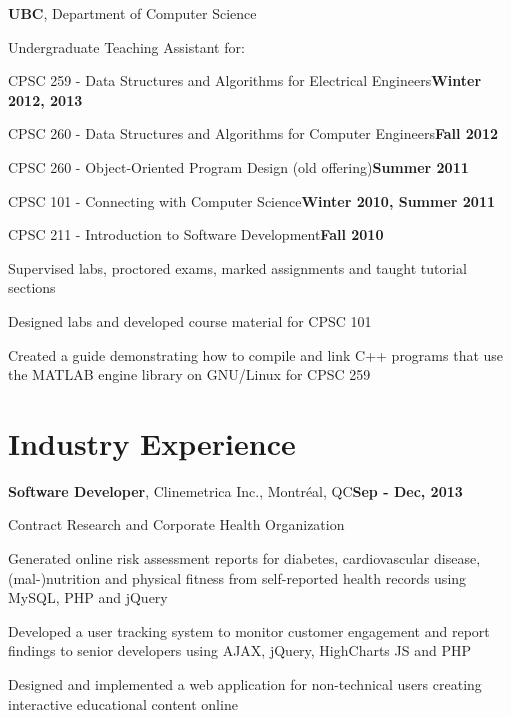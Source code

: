 \documentclass[margin,line]{res}
\newenvironment{list1}{
  \begin{list}{\ding{113}}{
      \setlength{\itemsep}{0in}
      \setlength{\parsep}{0in} \setlength{\parskip}{0in}
      \setlength{\topsep}{0in} \setlength{\partopsep}{0in}
      \setlength{\leftmargin}{0.17in}}}{\end{list}}
\newenvironment{list3}{
  \begin{list}{\textopenbullet}{
      \setlength{\itemsep}{0in}
      \setlength{\parsep}{0in} \setlength{\parskip}{0in}
      \setlength{\topsep}{0in} \setlength{\partopsep}{0in}
      \setlength{\leftmargin}{0.1in}}}{\end{list}}
\begin{document}
\begin{resume}
{\bf UBC}, Department of Computer Science\\
\vspace*{-.2cm}
\begin{list1}
\setlength\itemsep{0.25em}
\item[] Undergraduate Teaching Assistant for:\\[-0.1cm]
\item[] CPSC 259 - Data Structures and Algorithms for Electrical Engineers\hfill{\bf Winter 2012, 2013}
\item[] CPSC 260 - Data Structures and Algorithms for Computer Engineers\hfill{\bf Fall 2012}
\item[] CPSC 260 - Object-Oriented Program Design (old offering)\hfill{\bf Summer 2011}
\item[] CPSC 101 - Connecting with Computer Science\hfill{\bf Winter 2010, Summer 2011}
\item[] CPSC 211 - Introduction to Software Development\hfill{\bf Fall 2010}\\
\begin{list3}
\vspace*{-.1cm}
\setlength\itemsep{0.25em}
\item Supervised labs, proctored exams, marked assignments and taught tutorial sections
\item Designed labs and developed course material for CPSC 101
\item Created a guide demonstrating how to compile and link C++ programs that use the MATLAB engine library on GNU/Linux for CPSC 259
\end{list3}
\end{list1}

\vspace*{.3cm}

\section{\sc Industry Experience}

{\bf Software Developer}, Clinemetrica Inc., Montr\'eal, QC\hfill{\bf Sep - Dec, 2013}\\
\vspace*{-.2cm}
\begin{list1}
\item[] Contract Research and Corporate Health Organization
\vspace*{.2cm}
\begin{list3}
\setlength\itemsep{0.5em}
\item Generated online risk assessment reports for diabetes, cardiovascular disease, (mal-)nutrition and physical fitness from self-reported health records using MySQL, PHP and jQuery
\item Developed a user tracking system to monitor customer engagement and report findings to senior developers using AJAX, jQuery, HighCharts JS and PHP
\item Designed and implemented a web application for non-technical users creating interactive educational content online
\end{list3}
\end{list1}
\vspace*{.1cm}


\end{resume}
\end{document}
